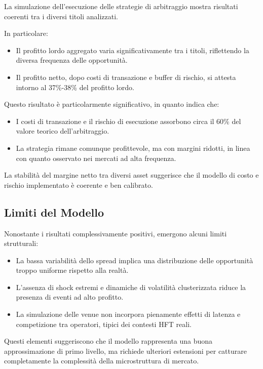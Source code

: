 \documentclass[10pt,final]{article}
\begin{document}
La simulazione dell'esecuzione delle strategie di arbitraggio mostra risultati coerenti tra i diversi titoli analizzati.

In particolare:

\begin{itemize}
    \item Il profitto lordo aggregato varia significativamente tra i titoli, riflettendo la diversa frequenza delle opportunità.
    \item Il profitto netto, dopo costi di transazione e buffer di rischio, si attesta intorno al 37\%-38\% del profitto lordo.
\end{itemize}

Questo risultato è particolarmente significativo, in quanto indica che:

\begin{itemize}
    \item I costi di transazione e il rischio di esecuzione assorbono circa il 60\% del valore teorico dell'arbitraggio.
    \item La strategia rimane comunque profittevole, ma con margini ridotti, in linea con quanto osservato nei mercati ad alta frequenza.
\end{itemize}

La stabilità del margine netto tra diversi asset suggerisce che il modello di costo e rischio implementato è coerente e ben calibrato.

\subsection{Limiti del Modello}

Nonostante i risultati complessivamente positivi, emergono alcuni limiti strutturali:

\begin{itemize}
    \item La bassa variabilità dello spread implica una distribuzione delle opportunità troppo uniforme rispetto alla realtà.
    \item L'assenza di shock estremi e dinamiche di volatilità clusterizzata riduce la presenza di eventi ad alto profitto.
    \item La simulazione delle venue non incorpora pienamente effetti di latenza e competizione tra operatori, tipici dei contesti HFT reali.
\end{itemize}

Questi elementi suggeriscono che il modello rappresenta una buona approssimazione di primo livello, ma richiede ulteriori estensioni per catturare completamente la complessità della microstruttura di mercato.
\end{document}
